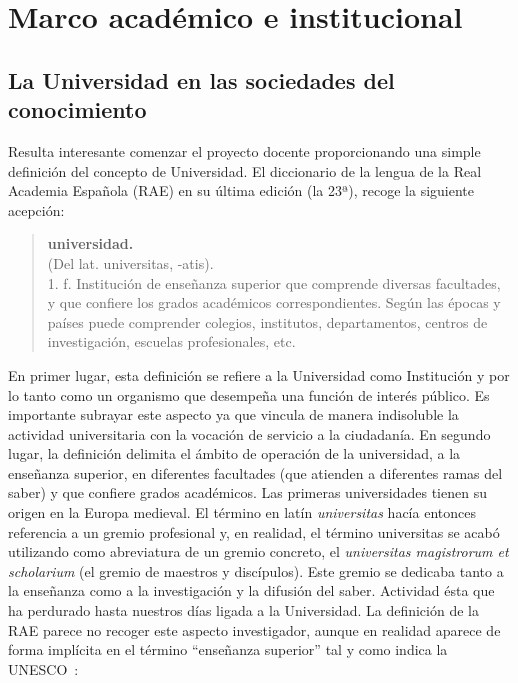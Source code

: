 \section{Marco académico e institucional}

\subsection{La Universidad en las sociedades del conocimiento}

Resulta interesante comenzar el proyecto docente proporcionando una simple definición del concepto de Universidad. El diccionario de la lengua de la Real Academia Española (RAE) en su última edición (la 23ª), recoge la siguiente acepción: 

\begin{quote}
\textbf{universidad.}\\
\hspace*{3mm}(Del lat. universitas, -atis).\\
1. f. Institución de enseñanza superior que comprende diversas facultades, y que confiere los grados académicos correspondientes. Según las épocas y países puede comprender colegios, institutos, departamentos, centros de investigación, escuelas profesionales, etc.
\end{quote}

En primer lugar, esta definición se refiere a la Universidad como Institución y por lo tanto como un organismo que desempeña una función de interés público. Es importante subrayar este aspecto ya que vincula de manera indisoluble la actividad universitaria con la vocación de servicio a la ciudadanía. En segundo lugar, la definición delimita el ámbito de operación de la universidad, a la enseñanza superior, en diferentes facultades (que atienden a diferentes ramas del saber) y que confiere grados académicos. Las primeras universidades tienen su origen en la Europa medieval. El término en latín \emph{universitas} hacía entonces referencia a un gremio profesional y, en realidad, el término universitas se acabó utilizando como abreviatura de un gremio concreto, el \emph{universitas magistrorum et scholarium} (el gremio de maestros y discípulos). Este gremio se dedicaba tanto a la enseñanza como a la investigación y la difusión del saber. Actividad ésta que ha perdurado hasta nuestros días ligada a la Universidad. La definición de la RAE parece no recoger este aspecto investigador, aunque en realidad aparece de forma implícita en el término ``enseñanza superior'' tal y como indica la UNESCO~\cite{unesco_2005}:

